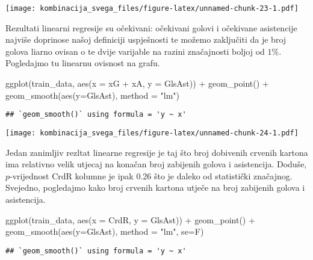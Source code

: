 \documentclass[
]{article}
\newenvironment{Shaded}{\begin{snugshade}}{\end{snugshade}}
\newcommand{\AttributeTok}[1]{\textcolor[rgb]{0.77,0.63,0.00}{#1}}
\newcommand{\FunctionTok}[1]{\textcolor[rgb]{0.00,0.00,0.00}{#1}}
\newcommand{\NormalTok}[1]{#1}
\newcommand{\SpecialCharTok}[1]{\textcolor[rgb]{0.00,0.00,0.00}{#1}}
\newcommand{\StringTok}[1]{\textcolor[rgb]{0.31,0.60,0.02}{#1}}
\begin{document}
\texttt{[image: kombinacija\_svega\_files/figure-latex/unnamed-chunk-23-1.pdf]}

Rezultati linearni regresije su očekivani: očekivani golovi i očekivane
asistencije najviše doprinose našoj definiciji uspješnosti te možemo
zaključiti da je broj golova liarno ovisan o te dvije varijable na
razini značajnosti boljoj od \(1\%\). Pogledajmo tu linearnu ovisnost na
grafu.

\begin{Shaded}
\begin{Highlighting}[]
\FunctionTok{ggplot}\NormalTok{(train\_data, }\FunctionTok{aes}\NormalTok{(}\AttributeTok{x =}\NormalTok{ xG }\SpecialCharTok{+}\NormalTok{ xA, }\AttributeTok{y =}\NormalTok{ GlsAst)) }\SpecialCharTok{+} \FunctionTok{geom\_point}\NormalTok{() }\SpecialCharTok{+} \FunctionTok{geom\_smooth}\NormalTok{(}\FunctionTok{aes}\NormalTok{(}\AttributeTok{y=}\NormalTok{GlsAst), }\AttributeTok{method =} \StringTok{"lm"}\NormalTok{)}
\end{Highlighting}
\end{Shaded}

\begin{verbatim}
## `geom_smooth()` using formula = 'y ~ x'
\end{verbatim}

\texttt{[image: kombinacija\_svega\_files/figure-latex/unnamed-chunk-24-1.pdf]}

Jedan zanimljiv rezltat linearne regresije je taj što broj dobivenih
crvenih kartona ima relativno velik utjecaj na konačan broj zabijenih
golova i asistencija. Doduše, \(p\)-vrijednost CrdR kolumne je ipak 0.26
što je daleko od statistički značajnog. Svejedno, pogledajmo kako broj
crvenih kartona utječe na broj zabijenih golova i asistencija.

\begin{Shaded}
\begin{Highlighting}[]
\FunctionTok{ggplot}\NormalTok{(train\_data, }\FunctionTok{aes}\NormalTok{(}\AttributeTok{x =}\NormalTok{ CrdR, }\AttributeTok{y =}\NormalTok{ GlsAst)) }\SpecialCharTok{+} \FunctionTok{geom\_point}\NormalTok{() }\SpecialCharTok{+} \FunctionTok{geom\_smooth}\NormalTok{(}\FunctionTok{aes}\NormalTok{(}\AttributeTok{y=}\NormalTok{GlsAst), }\AttributeTok{method =} \StringTok{"lm"}\NormalTok{, }\AttributeTok{se=}\NormalTok{F)}
\end{Highlighting}
\end{Shaded}

\begin{verbatim}
## `geom_smooth()` using formula = 'y ~ x'
\end{verbatim}
\end{document}
